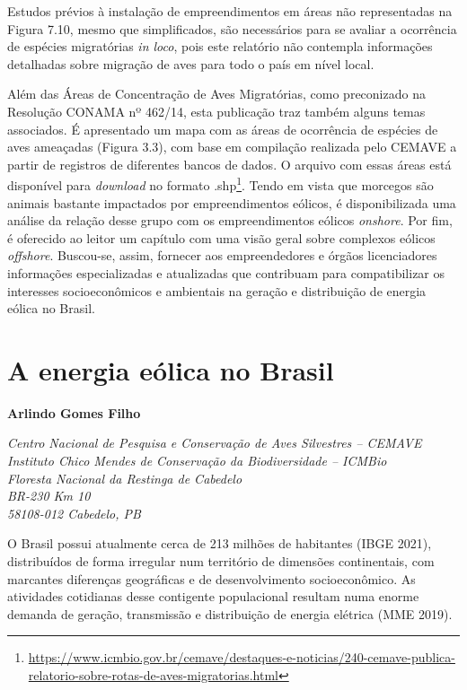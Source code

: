 \documentclass[
  oneside]{scrbook}
\DeclareRobustCommand{\href}[2]{#2\footnote{\url{#1}}}
\begin{document}
Estudos prévios à instalação de empreendimentos em áreas não representadas na Figura 7.10, mesmo que simplificados, são necessários para se avaliar a ocorrência de espécies migratórias \emph{in loco}, pois este relatório não contempla informações detalhadas sobre migração de aves para todo o país em nível local.

Além das Áreas de Concentração de Aves Migratórias, como preconizado na Resolução CONAMA nº 462/14, esta publicação traz também alguns temas associados. É apresentado um mapa com as áreas de ocorrência de espécies de aves ameaçadas (Figura 3.3), com base em compilação realizada pelo CEMAVE a partir de registros de diferentes bancos de dados. O arquivo com essas áreas está \href{https://www.icmbio.gov.br/cemave/destaques-e-noticias/240-cemave-publica-relatorio-sobre-rotas-de-aves-migratorias.html}{disponível para \emph{download} no formato .shp}. Tendo em vista que morcegos são animais bastante impactados por empreendimentos eólicos, é disponibilizada uma análise da relação desse grupo com os empreendimentos eólicos \emph{onshore}. Por fim, é oferecido ao leitor um capítulo com uma visão geral sobre complexos eólicos \emph{offshore}. Buscou-se, assim, fornecer aos empreendedores e órgãos licenciadores informações especializadas e atualizadas que contribuam para compatibilizar os interesses socioeconômicos e ambientais na geração e distribuição de energia eólica no Brasil.

\hypertarget{cap1}{%
\chapter{A energia eólica no Brasil}\label{cap1}}

\pagestyle{headings}

\textbf{Arlindo Gomes Filho}

\emph{Centro Nacional de Pesquisa e Conservação de Aves Silvestres -- CEMAVE}\\
\emph{Instituto Chico Mendes de Conservação da Biodiversidade -- ICMBio}\\
\emph{Floresta Nacional da Restinga de Cabedelo}\\
\emph{BR-230 Km 10}\\
\emph{58108-012 Cabedelo, PB}

O Brasil possui atualmente cerca de 213 milhões de habitantes (IBGE 2021), distribuídos de forma irregular num território de dimensões continentais, com marcantes diferenças geográficas e de desenvolvimento socioeconômico. As atividades cotidianas desse contigente populacional resultam numa enorme demanda de geração, transmissão e distribuição de energia elétrica (MME 2019).
\end{document}
